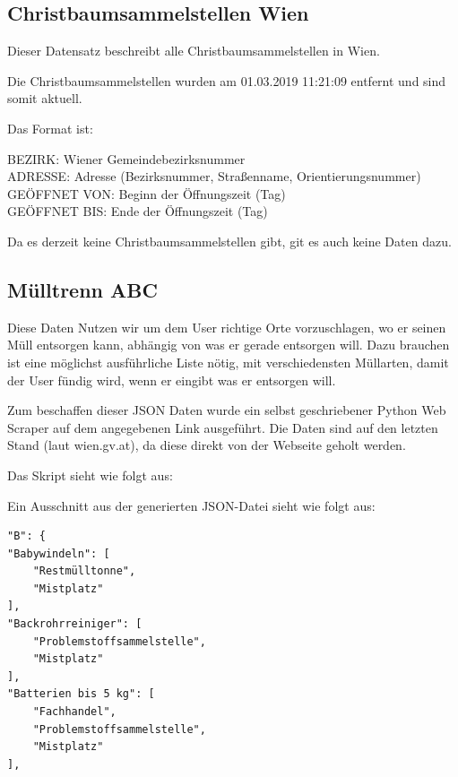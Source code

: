 \documentclass[12pt, a4paper]{scrreprt}
\begin{document}
\subsection{Christbaumsammelstellen Wien \cite{christbaumsammelstellen}}
    Dieser Datensatz beschreibt alle Christbaumsammelstellen in Wien.

    Die Christbaumsammelstellen wurden am 01.03.2019 11:21:09 entfernt und sind somit aktuell.

    Das Format ist:
    \begin{tcolorbox}
        BEZIRK: Wiener Gemeindebezirksnummer\\
        ADRESSE: Adresse (Bezirksnummer, Straßenname, Orientierungsnummer)\\
        GEÖFFNET VON: Beginn der Öffnungszeit (Tag)\\
        GEÖFFNET BIS: Ende der Öffnungszeit (Tag) 
    \end{tcolorbox}
    
    Da es derzeit keine Christbaumsammelstellen gibt, git es auch keine Daten dazu.
\subsection{Mülltrenn ABC \cite{muelltrennabc}}
Diese Daten Nutzen wir um dem User richtige Orte vorzuschlagen, wo er seinen Müll entsorgen kann, abhängig von was er gerade entsorgen will. Dazu brauchen ist eine möglichst ausführliche Liste nötig, mit verschiedensten Müllarten, damit der User fündig wird, wenn er eingibt was er entsorgen will.

Zum beschaffen dieser JSON Daten wurde ein selbst geschriebener Python Web Scraper auf dem angegebenen Link ausgeführt. Die Daten sind auf den letzten Stand (laut wien.gv.at), da diese direkt von der Webseite geholt werden.

Das Skript sieht wie folgt aus:



Ein Ausschnitt aus der generierten JSON-Datei sieht wie folgt aus:

\begin{lstlisting}
"B": {
"Babywindeln": [
    "Restmülltonne",
    "Mistplatz"
],
"Backrohrreiniger": [
    "Problemstoffsammelstelle",
    "Mistplatz"
],
"Batterien bis 5 kg": [
    "Fachhandel",
    "Problemstoffsammelstelle",
    "Mistplatz"
], 
\end{lstlisting}
\end{document}
